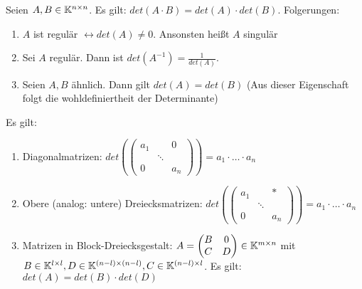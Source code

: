 \begin{satz}[Determinantenmultiplikationssatz]
	Seien $A,B \in \mathbb{K}^{n \times n}$. Es gilt: $det(A \cdot B) = det(A) \cdot det(B)$. Folgerungen:
	
	\begin{enumerate}[noitemsep]
		\item $A$ ist regulär $\leftrightarrow det(A) \neq 0$. Ansonsten heißt $A$ singulär
		\item Sei $A$ regulär. Dann ist $det(A^{-1}) = \frac{1}{det(A)}$.
		\item Seien $A,B$ ähnlich. Dann gilt $det(A) = det(B)$ (Aus dieser Eigenschaft folgt die wohldefiniertheit der Determinante)
	\end{enumerate}
\end{satz}

\begin{satz} Es gilt:
	\begin{enumerate}[noitemsep]
		\item Diagonalmatrizen: $det( \left( \begin{smallmatrix}
		a_1 & & 0 \\
		& \ddots & \\
		0 & & a_n 
		\end{smallmatrix} \right) ) = a_1 \cdot \dots \cdot a_n$
		\item Obere (analog: untere) Dreiecksmatrizen: $det( \left( \begin{smallmatrix}
		a_1 & & * \\
		& \ddots & \\
		0 & & a_n 
		\end{smallmatrix}  \right) ) = a_1 \cdot \dots \cdot a_n$
		\item Matrizen in Block-Dreiecksgestalt: $A = \begin{pmatrix}
		B & 0 \\
		C & D 
		\end{pmatrix} \in \mathbb{K}^{m \times n}$ mit $B \in \mathbb{K}^{l \times l}, D \in \mathbb{K}^{(n-l) \times (n-l)}, C \in \mathbb{K}^{(n-l) \times l}$.
		Es gilt: $det(A) = det(B) \cdot det(D)$
	\end{enumerate}
\end{satz}



